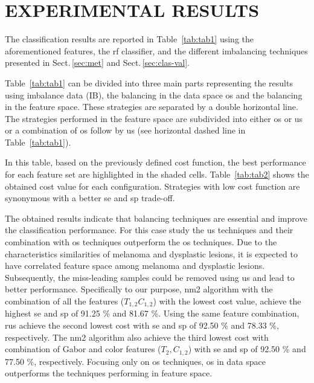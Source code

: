 \graphicspath{ {./content/Experiments-results/figures/} }

\section{\uppercase{Experimental Results}}
\label{sec:exp-res} 

\noindent The classification results are reported in Table~\ref{tab:tab1} using the aforementioned features, the \ac{rf} classifier, and the different imbalancing techniques presented in Sect.\,\ref{sec:met} and Sect.\,\ref{sec:clas-val}. 

Table~\ref{tab:tab1} can be divided into three main parts representing the results using imbalance data (IB), the balancing in the data space \ac{os} and the balancing in the feature space.
These strategies are separated by a double horizontal line.
The strategies performed in the feature space are subdivided into either \ac{os} or \ac{us} or a combination of \ac{os} follow by \ac{us} (see horizontal dashed line in Table~\ref{tab:tab1}).

In this table, based on the previously defined cost function, the best performance for each feature set are highlighted in the shaded cells.
Table~\ref{tab:tab2} shows the obtained cost value for each configuration. 
Strategies with low cost function are synonymous with a better \ac{se} and \ac{sp} trade-off.

The obtained results indicate that balancing techniques are essential and improve the classification performance. 
For this case study the \ac{us} techniques and their combination with \ac{os} techniques outperform the \ac{os} techniques. 
Due to the characteristics similarities of melanoma and dysplastic lesions, it is expected to have correlated feature space among melanoma and dysplastic lesions. 
Subsequently, the miss-leading samples could be removed using \ac{us} and lead to better performance.
Specifically to our purpose, \ac{nm2} algorithm with the combination of all the features ($T_{1,2} C_{1,2}$) with the lowest cost value, achieve the highest \ac{se} and \ac{sp} of 91.25 \% and 81.67 \%. 
Using the same feature combination, \ac{rus} achieve the second lowest cost with \ac{se} and \ac{sp} of 92.50 \% and 78.33 \%, respectively. 
The \ac{nm2} algorithm also achieve the third lowest cost with combination of Gabor and color features ($T_{2}, C_{1,2}$) with \ac{se} and \ac{sp} of 92.50 \% and 77.50 \%, respectively.  
Focusing only on \ac{os} techniques, \ac{os} in data space outperforms the techniques performing in feature space.

